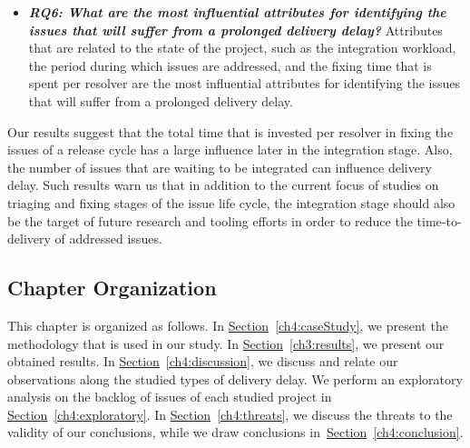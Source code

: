 \begin{itemize}
	\item \textbf{\textit{RQ6: What are the most influential attributes for
		identifying the issues that will suffer from a prolonged delivery
delay?}} Attributes that are related to the state of the project, such as the
integration workload, the period during which issues are addressed, and the fixing
time that is spent per resolver are the most influential attributes for
identifying the issues that will suffer from a prolonged delivery delay.\\

\end{itemize}


Our results suggest that the total time that is invested per resolver in fixing
the issues of a release cycle has a large influence later in the integration
stage. Also, the number of issues that are waiting to be integrated can
influence delivery delay. Such results warn us that in addition to the current
focus of studies on triaging and fixing stages of the issue life cycle, the
integration stage should also be the target of future research and tooling
efforts in order to reduce the time-to-delivery of addressed issues.

\subsection*{Chapter Organization}

This chapter is organized as follows. In
\hyperref[ch4:caseStudy]{Section}~\ref{ch4:caseStudy}, we present the
methodology that is used in our study. In
\hyperref[ch3:results]{Section}~\ref{ch3:results}, we present our obtained
results. In \hyperref[ch4:resultsdiscussion]{Section}~\ref{ch4:discussion}, we
discuss and relate our observations along the studied types of delivery delay.
We perform an exploratory analysis on the backlog of issues of each studied
project in \hyperref[ch4:discussion]{Section}~\ref{ch4:exploratory}. In
\hyperref[ch4:threats]{Section}~\ref{ch4:threats}, we discuss the threats to the
validity of our conclusions, while we draw conclusions
in~\hyperref[ch4:conclusion]{Section}~\ref{ch4:conclusion}.

